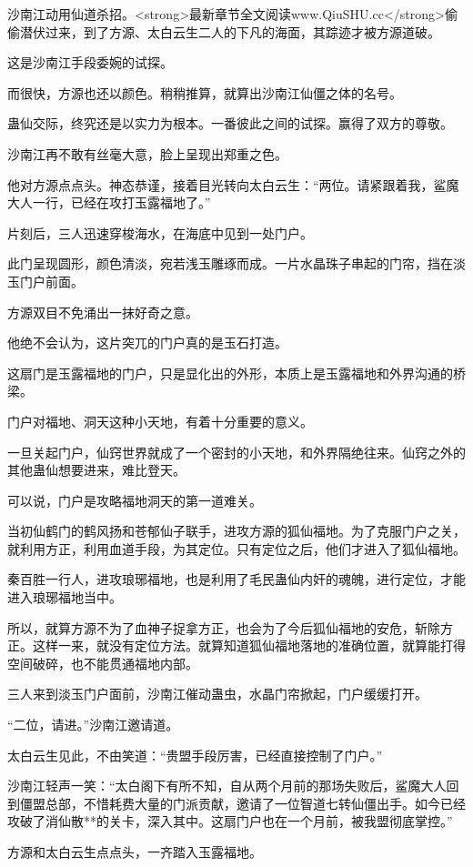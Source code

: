 \begin{this_body}
沙南江动用仙道杀招。<strong>最新章节全文阅读www.QiuSHU.cc</strong>偷偷潜伏过来，到了方源、太白云生二人的下凡的海面，其踪迹才被方源道破。

这是沙南江手段委婉的试探。

而很快，方源也还以颜色。稍稍推算，就算出沙南江仙僵之体的名号。

蛊仙交际，终究还是以实力为根本。一番彼此之间的试探。赢得了双方的尊敬。

沙南江再不敢有丝毫大意，脸上呈现出郑重之色。

他对方源点点头。神态恭谨，接着目光转向太白云生：“两位。请紧跟着我，鲨魔大人一行，已经在攻打玉露福地了。”

片刻后，三人迅速穿梭海水，在海底中见到一处门户。

此门呈现圆形，颜色清淡，宛若浅玉雕琢而成。一片水晶珠子串起的门帘，挡在淡玉门户前面。

方源双目不免涌出一抹好奇之意。

他绝不会认为，这片突兀的门户真的是玉石打造。

这扇门是玉露福地的门户，只是显化出的外形，本质上是玉露福地和外界沟通的桥梁。

门户对福地、洞天这种小天地，有着十分重要的意义。

一旦关起门户，仙窍世界就成了一个密封的小天地，和外界隔绝往来。仙窍之外的其他蛊仙想要进来，难比登天。

可以说，门户是攻略福地洞天的第一道难关。

当初仙鹤门的鹤风扬和苍郁仙子联手，进攻方源的狐仙福地。为了克服门户之关，就利用方正，利用血道手段，为其定位。只有定位之后，他们才进入了狐仙福地。

秦百胜一行人，进攻琅琊福地，也是利用了毛民蛊仙内奸的魂魄，进行定位，才能进入琅琊福地当中。

所以，就算方源不为了血神子捉拿方正，也会为了今后狐仙福地的安危，斩除方正。这样一来，就没有定位方法。就算知道狐仙福地落地的准确位置，就算能打得空间破碎，也不能贯通福地内部。

三人来到淡玉门户面前，沙南江催动蛊虫，水晶门帘掀起，门户缓缓打开。

“二位，请进。”沙南江邀请道。

太白云生见此，不由笑道：“贵盟手段厉害，已经直接控制了门户。”

沙南江轻声一笑：“太白阁下有所不知，自从两个月前的那场失败后，鲨魔大人回到僵盟总部，不惜耗费大量的门派贡献，邀请了一位智道七转仙僵出手。如今已经攻破了消仙散**的关卡，深入其中。这扇门户也在一个月前，被我盟彻底掌控。”

方源和太白云生点点头，一齐踏入玉露福地。


\end{this_body}
